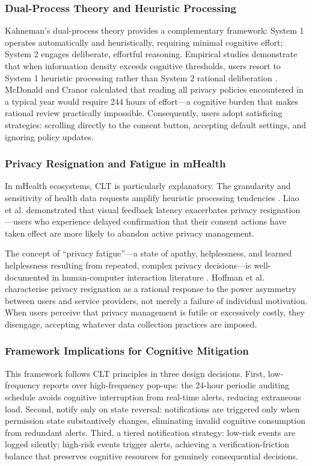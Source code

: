 \subsubsection{Dual-Process Theory and Heuristic Processing}
Kahneman's dual-process theory \cite{22} provides a complementary framework: System 1 operates automatically and heuristically, requiring minimal cognitive effort; System 2 engages deliberate, effortful reasoning. Empirical studies demonstrate that when information density exceeds cognitive thresholds, users resort to System 1 heuristic processing rather than System 2 rational deliberation \cite{12, 13}. McDonald and Cranor \cite{12} calculated that reading all privacy policies encountered in a typical year would require 244 hours of effort—a cognitive burden that makes rational review practically impossible. Consequently, users adopt satisficing strategies: scrolling directly to the consent button, accepting default settings, and ignoring policy updates.

\subsubsection{Privacy Resignation and Fatigue in mHealth}
In mHealth ecosystems, CLT is particularly explanatory. The granularity and sensitivity of health data requests amplify heuristic processing tendencies \cite{14}. Liao et al. \cite{14} demonstrated that visual feedback latency exacerbates privacy resignation—users who experience delayed confirmation that their consent actions have taken effect are more likely to abandon active privacy management.

The concept of ``privacy fatigue''—a state of apathy, helplessness, and learned helplessness resulting from repeated, complex privacy decisions—is well-documented in human-computer interaction literature \cite{10}. Hoffman et al. \cite{10} characterise privacy resignation as a rational response to the power asymmetry between users and service providers, not merely a failure of individual motivation. When users perceive that privacy management is futile or excessively costly, they disengage, accepting whatever data collection practices are imposed.

\subsubsection{Framework Implications for Cognitive Mitigation}
This framework follows CLT principles in three design decisions. First, low-frequency reports over high-frequency pop-ups: the 24-hour periodic auditing schedule avoids cognitive interruption from real-time alerts, reducing extraneous load. Second, notify only on state reversal: notifications are triggered only when permission state substantively changes, eliminating invalid cognitive consumption from redundant alerts. Third, a tiered notification strategy: low-risk events are logged silently; high-risk events trigger alerts, achieving a verification-friction balance that preserves cognitive resources for genuinely consequential decisions.


